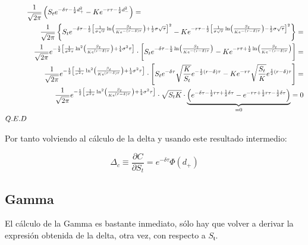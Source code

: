 \documentclass[12pt]{article}
\begin{document}
\begin{eqnarray*}
	\lefteqn{\frac{1}{\sqrt{2\pi}}\left(S_{t}e^{-\delta\tau-\frac{1}{2}d_{+}^{2}}-Ke^{-r\tau-\frac{1}{2}d_{-}^{2}}\right) =} \\
	  &  & \frac{1}{\sqrt{2\pi}}\left\{ S_{t}e^{-\delta\tau-\frac{1}{2}\left[\frac{1}{\sigma\sqrt{\tau}}\ln\left(\frac{S_{t}} 
	{Ke^{-\left(r-\delta\right)\tau}}\right)+\frac{1}{2}\sigma\sqrt{\tau}\right]^{2}} - 
	 Ke^{-r\tau-\frac{1}{2}\left[\frac{1}{\sigma\sqrt{\tau}}\ln\left(\frac{S_{t}}{Ke^{-\left(r-\delta\right)\tau}}
	\right)-\frac{1}{2}\sigma\sqrt{\tau}\right]^{2}}\right\} = \\
	  &  & \frac{1}{\sqrt{2\pi}}e^{-\frac{1}{2}\left[\frac{1}{\sigma^{2}\tau}\ln^{2}\left(\frac{S_{t}}{Ke^{\left(r-\delta\right)
	\tau}}\right) + \frac{1}{4}\sigma^{2}\tau\right]}\cdot\left[S_{t}e^{-\delta\tau-\frac{1}{2}\ln\left(\frac{S_{t}}
	{Ke^{-\left(r-\delta\right)\tau}}\right)}-
	Ke^{-r\tau+\frac{1}{2}\ln\left(\frac{S_{t}}{Ke^{-\left(r-\delta\right)\tau}}\right)}\right] = \\
	  &  & \frac{1}{\sqrt{2\pi}}e^{-\frac{1}{2}\left[\frac{1}{\sigma^{2}\tau}\ln^{2}\left(\frac{S_{t}}{Ke^{\left(r-\delta\right)
	\tau}}\right) + \frac{1}{4}\sigma^{2}\tau\right]}\cdot\left[S_{t}e^{-\delta\tau}\sqrt{\frac{K}{S_{t}}}e^{-\frac{1}{2}
	\left(r-\delta\right)\tau}-Ke^{-r\tau}\sqrt{\frac{S_{t}}{K}}e^{\frac{1}{2}\left(r-\delta\right)\tau}\right] = \\
	  &  & \frac{1}{\sqrt{2\pi}}e^{-\frac{1}{2}\left[\frac{1}{\sigma^{2}\tau}\ln^{2}\left(\frac{S_{t}}{Ke^{\left(r-\delta\right)
	\tau}}\right) + \frac{1}{4}\sigma^{2}\tau\right]}\cdot\sqrt{S_{t}K}\cdot
	\underbrace{\left(e^{-\delta\tau-\frac{1}{2}r\tau+\frac{1}{2}
	\delta\tau}-e^{-r\tau+\frac{1}{2}r\tau-\frac{1}{2}\delta\tau}\right)}_{=0} = 0 \\
	Q.E.D
\end{eqnarray*}
\newline

Por tanto volviendo al c\'{a}lculo de la delta y usando este resultado intermedio:
\newline

\begin{equation}
	\Delta_{c}\equiv\frac{\partial C}{\partial S_{t}} = e^{-\delta\tau}\Phi\left(d_{+}\right)
\end{equation}
\newline

\subsection{Gamma}
El c\'{a}lculo de la Gamma es bastante inmediato, s\'{o}lo hay que volver a derivar la expresi\'{o}n obtenida de la delta, otra vez, con respecto
a $S_{ŧ}$.
\newline
\end{document}
